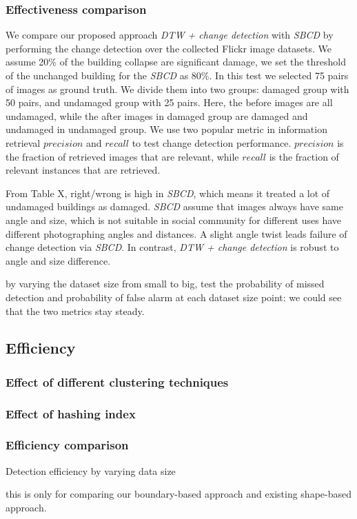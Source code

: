 \documentclass[runningheads,a4paper]{llncs}
\begin{document}
\subsubsection{Effectiveness comparison}
We compare our proposed approach \textit{DTW + change detection} with \textit{SBCD} \cite{rs2051217} by performing the change detection over the collected Flickr image datasets.
We assume 20\% of the building collapse are significant damage, we set the threshold of the unchanged building for the \textit{SBCD} as 80\%.
In this test we selected 75 pairs of images as ground truth. We divide them into two groups: damaged group with 50 pairs, and undamaged group with 25 pairs. Here, the before images are all undamaged, while the after images in damaged group are damaged and undamaged in undamaged group. 
We use two popular metric in information retrieval $precision$ and $recall$ to test change detection performance. $precision$ is the fraction of retrieved images that are relevant, while $recall$ is the fraction of relevant instances that are retrieved. 

From Table X, right/wrong is high in \textit{SBCD}, which means it treated a lot of undamaged buildings as damaged. \textit{SBCD} assume that images always have same angle and size, which is not suitable in social community for different uses have different photographing angles and distances. A slight angle twist leads failure of change detection via \textit{SBCD}. In contrast, \textit{DTW + change detection} is robust to angle and size difference.

by varying the dataset size from small to big, test the probability of missed detection and probability of false alarm at each dataset size point: we could see that the two metrics stay steady.

\subsection{Efficiency}

\subsubsection{Effect of different clustering techniques}
\subsubsection{Effect of hashing index}

\subsubsection{Efficiency comparison}

Detection efficiency by varying data size

this is only for comparing our boundary-based approach and existing shape-based approach.



\end{document}
